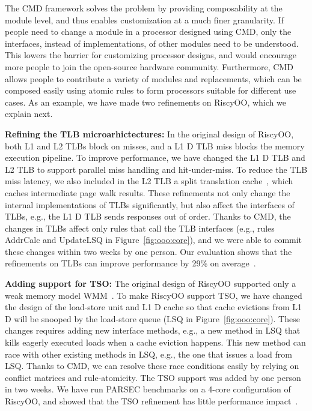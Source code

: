 \documentclass[conference]{IEEEtran}
\begin{document}
The CMD framework solves the problem by providing composability at the module level, and thus enables customization at a much finer granularity.
If people need to change a module in a processor designed using CMD, only the interfaces, instead of implementations, of other modules need to be understood.
This lowers the barrier for customizing processor designs, and would encourage more people to join the open-source hardware community.
Furthermore, CMD allows people to contribute a variety of modules and replacements, which can be composed easily using atomic rules to form processors suitable for different use cases.
As an example, we have made two refinements on RiscyOO, which we explain next.

\noindent\textbf{Refining the TLB microarhictectures:}
In the original design of RiscyOO, both L1 and L2 TLBs block on misses, and a L1 D TLB miss blocks the memory execution pipeline.
To improve performance, we have changed the L1 D TLB and L2 TLB to support parallel miss handling and hit-under-miss.
To reduce the TLB miss latency, we also included in the L2 TLB a split translation cache~\cite{translationCache}, which caches intermediate page walk results.
These refinements not only change the internal implementations of TLBs significantly, but also affect the interfaces of TLBs, e.g., the L1 D TLB sends responses out of order.
Thanks to CMD, the changes in TLBs affect only rules that call the TLB interfaces (e.g., rules AddrCalc and UpdateLSQ in Figure~\ref{fig:ooo:core}), and we were able to commit these changes within two weeks by one person.
Our evaluation shows that the refinements on TLBs can improve performance by 29\% on average~\cite{riscyoo}.

\noindent\textbf{Adding support for TSO:}
The original design of RiscyOO supported only a weak memory model WMM~\cite{wmm}.
To make RiscyOO support TSO, we have changed the design of the load-store unit and L1 D cache so that cache evictions from L1 D will be snooped by the load-store queue (LSQ in Figure~\ref{fig:ooo:core}).
These changes requires adding new interface methods, e.g., a new method in LSQ that kills eagerly executed loads when a cache eviction happens.
This new method can race with other existing methods in LSQ, e.g., the one that issues a load from LSQ.
Thanks to CMD, we can resolve these race conditions easily by relying on conflict matrices and rule-atomicity.
The TSO support was added by one person in two weeks.
We have run PARSEC benchmarks on a 4-core configuration of RiscyOO, and showed that the TSO refinement has little performance impact~\cite{riscyoo}.
\end{document}

